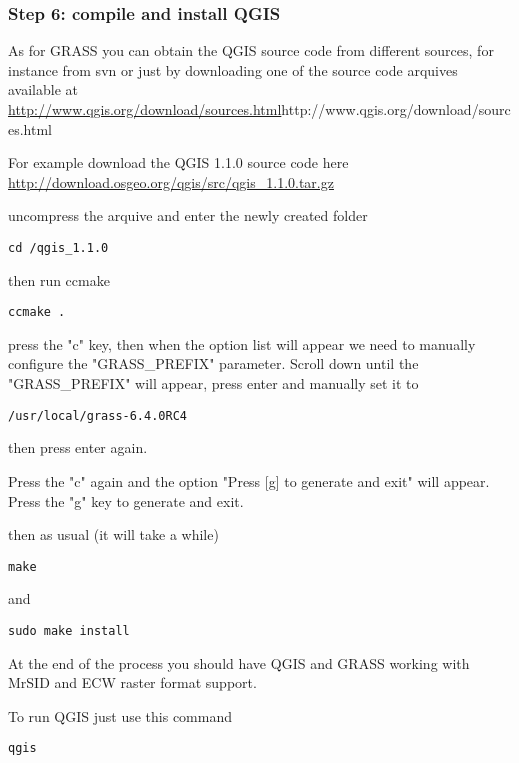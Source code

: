 \subsubsection{Step 6: compile and install QGIS}
As for GRASS you can obtain the QGIS source code from different sources,
for instance from svn or just by downloading one of the source code arquives available
at \url {http://www.qgis.org/download/sources.html}{http://www.qgis.org/download/sources.html}

For example download the QGIS 1.1.0 source code here \\
\url{http://download.osgeo.org/qgis/src/qgis\_1.1.0.tar.gz}

uncompress the arquive and enter the newly created folder

\begin{verbatim}
cd /qgis_1.1.0
\end{verbatim}

then run ccmake

\begin{verbatim}
ccmake .
\end{verbatim}

press the "c" key, then when the option list will appear we need to manually
configure the "GRASS\_PREFIX" parameter. Scroll down until the "GRASS\_PREFIX" will appear, 
press enter and manually set it to

\begin{verbatim}
/usr/local/grass-6.4.0RC4
\end{verbatim}

then press enter again.

Press the "c" again and the option "Press [g] to generate and exit" will appear.
Press the "g" key to generate and exit.

then as usual (it will take a while)

\begin{verbatim}
make
\end{verbatim}

and

\begin{verbatim}
sudo make install
\end{verbatim}

At the end of the process you should have QGIS and GRASS working with MrSID and ECW
raster format support.

To run QGIS just use this command 

\begin{verbatim}
qgis
\end{verbatim}


